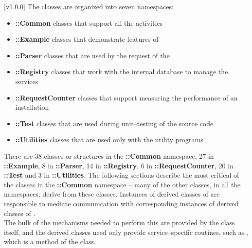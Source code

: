 [v1.0.0]
The \mplusm{} classes are organized into seven namespaces:
\begin{itemize}
\item \textbf{\mplusm{}::Common} classes that support all the \mplusm{} activities
\item \textbf{\mplusm{}::Example} classes that demonstrate features of \mplusm{}
\item \textbf{\mplusm{}::Parser} classes that are used by the
 request of the
\item \textbf{\mplusm{}::Registry} classes that work with the internal database to manage
the \mplusm{} services
\item \textbf{\mplusm{}::RequestCounter} classes that support measuring the performance
of an \mplusm{} installation
\item \textbf{\mplusm{}::Test} classes that are used during unit--testing of the \mplusm{}
source code
\item \textbf{\mplusm{}::Utilities} classes that are used only with the \mplusm{}
utility programs
\end{itemize}
There are 38 classes or structures in the \textbf{\mplusm{}::Common} namespace, 27 in
\textbf{\mplusm{}::Example}, 8 in \textbf{\mplusm{}::Parser}, 14 in
\textbf{\mplusm{}::Registry}, 6 in \textbf{\mplusm{}::RequestCounter}, 20 in
\textbf{\mplusm{}::Test} and 3 in \textbf{\mplusm{}::Utilities}.
The following sections describe the most critical of the classes in the
\textbf{\mplusm{}::Common} namespace -- many of the other classes, in all the namespaces,
derive from these classes. 
Instances of derived classes of  are responsible to
mediate \mplusm{} communication with corresponding instances of derived classes of
.\\

The bulk of the mechanisms needed to perform this are provided by the
 class itself, and the derived classes need only
provide service--specific routines, such as ,
which is a method of the  class.\\

